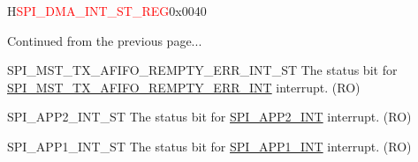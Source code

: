 \addtocounter{Regfloat}{-1}
\begin{register}{H}{\textcolor{red}{SPI\_DMA\_INT\_ST\_REG}}{0x{}0040}
\begin{regdesc}\begin{reglist}
\item [Continued from the previous page...]
\label{fielddesc:SPIMSTTXAFIFOREMPTYERRINTST}\item [SPI\_MST\_TX\_AFIFO\_REMPTY\_ERR\_INT\_ST] The status bit for \hyperref[int:SPIMSTTXAFIFOREMPTYERRINT]{SPI\_MST\_TX\_AFIFO\_REMPTY\_ERR\_INT} interrupt. (RO)
\label{fielddesc:SPIAPP2INTST}\item [SPI\_APP2\_INT\_ST] The status bit for \hyperref[int:SPIAPP2INT]{SPI\_APP2\_INT} interrupt. (RO)
\label{fielddesc:SPIAPP1INTST}\item [SPI\_APP1\_INT\_ST] The status bit for \hyperref[int:SPIAPP1INT]{SPI\_APP1\_INT} interrupt. (RO)
\end{reglist}\end{regdesc}
\end{register}


